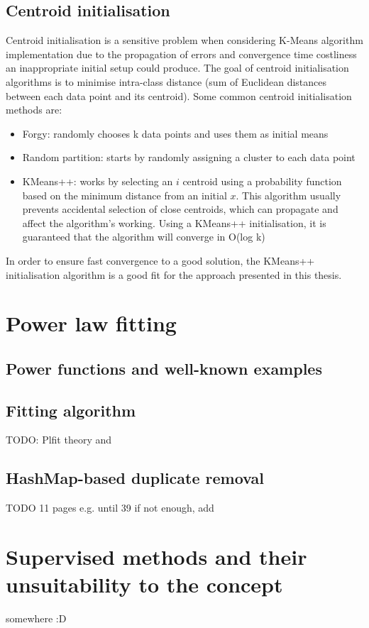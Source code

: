 \documentclass[12pt,a4paper,twoside]{report}
\begin{document}
\subsection{Centroid initialisation}
Centroid initialisation is a sensitive problem when considering K-Means algorithm implementation due to the propagation of errors and convergence time costliness an inappropriate initial setup could produce. The goal of centroid initialisation algorithms is to minimise intra-class distance (sum of Euclidean distances between each data point and its centroid). Some common centroid initialisation methods are:

\begin{itemize}
\item Forgy: randomly chooses k data points and uses them as initial means
\item Random partition: starts by randomly assigning a cluster to each data point
\item KMeans++: works by selecting an $i$ centroid using a probability function based on the minimum distance from an initial $x$. This algorithm usually prevents accidental selection of close centroids, which can propagate and affect the algorithm's working. Using a KMeans++ initialisation, it is guaranteed that the algorithm will converge in O(log k)
\end{itemize}

In order to ensure fast convergence to a good solution, the KMeans++ initialisation algorithm is a good fit for the approach presented in this thesis.\label{kmeansplusplus}

\section{Power law fitting}
\subsection{Power functions and well-known examples}
\subsection{Fitting algorithm}
\label{plfittheory}
TODO: Plfit theory and \cite{clauset2009power}

\subsection{HashMap-based duplicate removal}
{\color{red}TODO 11 pages e.g. until 39
if not enough, add
\section{Supervised methods and their unsuitability to the concept}
somewhere :D}
\end{document}
